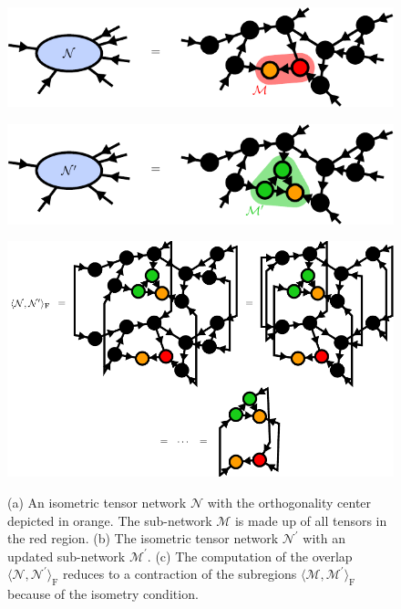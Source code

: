 \begin{figure}
	\centering
	\subcaptionbox{\label{fig:isometric_tensor_network_N}}
	{%
		\includegraphics[scale=1]{figures/tikz/Tensor_Networks/contractions_of_isometric_tensor_networks/contractions_of_isometric_tensor_networks_a.pdf}
	}
	\par\bigskip
	\subcaptionbox{\label{fig:isometric_tensor_network_N_prime}}
	{%
		\includegraphics[scale=1]{figures/tikz/Tensor_Networks/contractions_of_isometric_tensor_networks/contractions_of_isometric_tensor_networks_b.pdf}
	}
	\par\bigskip
	\subcaptionbox{\label{fig:isometric_tensor_network_norm_contraction}}
	{%
		\includegraphics[scale=1]{figures/tikz/Tensor_Networks/contractions_of_isometric_tensor_networks/contractions_of_isometric_tensor_networks_c.pdf}
	}
	\caption{(a) An isometric tensor network $\mathcal{N}$ with the orthogonality center depicted in orange. The sub-network $\mathcal{M}$ is made up of all tensors in the red region. (b) The isometric tensor network $\mathcal{N}^\prime$ with an updated sub-network $\mathcal{M}^\prime$. (c) The computation of the overlap $\langle\mathcal{N},\mathcal{N}^\prime\rangle_\text{F}$ reduces to a contraction of the subregions $\langle\mathcal{M},\mathcal{M}^\prime\rangle_\text{F}$ because of the isometry condition.}
	\label{fig:isometric_tensor_network_local_approximation}
\end{figure}